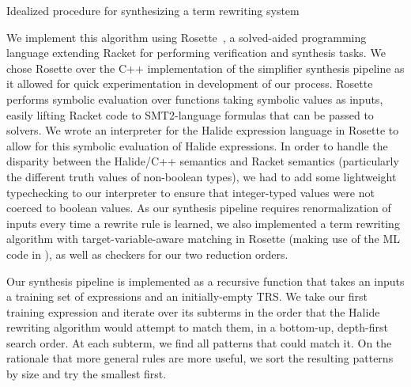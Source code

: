 \begin{algorithm}[H]
\SetAlgoLined
{}
\caption{Idealized procedure for synthesizing a term rewriting system}
\label{algo:synthesis}
\end{algorithm}

We implement this algorithm using Rosette~\citep{torlak2014lightweight}, a solved-aided programming language extending Racket for performing verification and synthesis tasks. We chose Rosette over the C++ implementation of the simplifier synthesis pipeline as it allowed for quick experimentation in development of our process. Rosette performs symbolic evaluation over functions taking symbolic values as inputs, easily lifting Racket code to SMT2-language formulas that can be passed to solvers. We wrote an interpreter for the Halide expression language in Rosette to allow for this symbolic evaluation of Halide expressions. In order to handle the disparity between the Halide/C++ semantics and Racket semantics (particularly the different truth values of non-boolean types), we had to add some lightweight typechecking to our interpreter to ensure that integer-typed values were not coerced to boolean values. As our synthesis pipeline requires renormalization of inputs every time a rewrite rule is learned, we also implemented a term rewriting algorithm with target-variable-aware matching in Rosette (making use of the ML code in \cite{baader1999term}), as well as checkers for our two reduction orders. 

Our synthesis pipeline is implemented as a recursive function that takes an inputs a training set of expressions and an initially-empty TRS. We take our first training expression and iterate over its subterms in the order that the Halide rewriting algorithm would attempt to match them, in a bottom-up, depth-first search order. At each subterm, we find all patterns that could match it. On the rationale that more general rules are more useful, we sort the resulting patterns by size and try the smallest first. 

